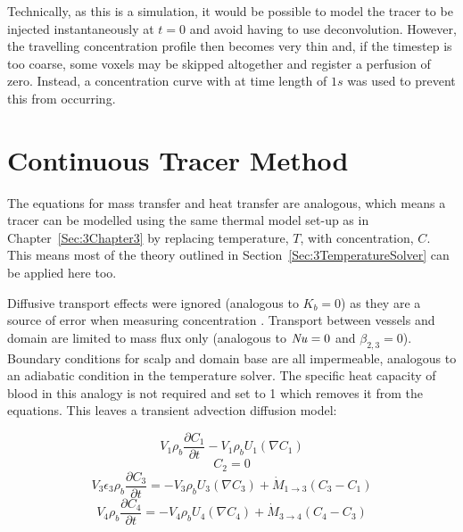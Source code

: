 \documentclass[11pt,english,a4paper,twoside,openright]{report}
\newcommand\Nuss{\mbox{\textit{Nu}}}
\begin{document}
{{{{{{{{Technically, as this is a simulation, it would be possible to model the tracer to be injected instantaneously at $t=0$ and avoid having to use deconvolution. However, the travelling concentration profile then becomes very thin and, if the timestep is too coarse, some voxels may be skipped altogether and register a perfusion of zero. Instead, a concentration curve with at time length of $1s$ was used to prevent this from occurring.

\section[Continuous Tracer Method]{{\Large C}ontinuous {\Large T}racer {\Large M}ethod}
\label{Sec:4ContinousTracerMethod}

The equations for mass transfer and heat transfer are analogous, which means a tracer can be modelled using the same thermal model set-up as in Chapter~\ref{Sec:3Chapter3} by replacing temperature, $T$, with concentration, $C$. This means most of the theory outlined in Section~\ref{Sec:3TemperatureSolver} can be applied here too.

Diffusive transport effects were ignored (analogous to $K_{b} = 0$) as they are a source of error when measuring concentration \cite{wu2003tracer}. Transport between vessels and domain are limited to mass flux only (analogous to $\Nuss=0$ and $\beta_{2,3}=0$). Boundary conditions for scalp and domain base are all impermeable, analogous to an adiabatic condition in the temperature solver. The specific heat capacity of blood in this analogy is not required and set to 1 which removes it from the equations. This leaves a transient advection diffusion model:

\begin{equation}
\label{Eq:Concentration1}
V_{1}\rho_{b}\frac{\partial C_{1}}{\partial t}-V_{1}\rho_{b}U_{1}(\nabla C_{1}) 
\end{equation}
\begin{equation}
\label{Eq:Concentration2}
C_{2}=0
\end{equation}
\begin{equation}
\label{Eq:Concentration3}
V_{3}\epsilon_{3}\rho_{b}\frac{\partial C_{3}}{\partial t}=-V_{3}\rho_{b}U_{3}(\nabla C_{3})+\dot{M}_{1\rightarrow3}(C_{3}-C_{1})
\end{equation}
\begin{equation}
\label{Eq:Concentration4}
V_{4}\rho_{b}\frac{\partial C_{4}}{\partial t}=-V_{4}\rho_{b}U_{4}(\nabla C_{4})+\dot{M}_{3\rightarrow4}(C_{4}-C_{3})
\end{equation}

}}}}}}}}
\end{document}
